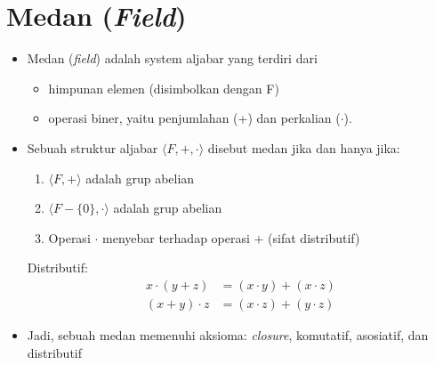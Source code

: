 \documentclass{article}
\begin{document}

\section*{Medan (\textit{Field})}

\begin{itemize}
    \item Medan (\textit{field}) adalah system aljabar yang terdiri dari
    \begin{itemize}
        \item himpunan elemen (disimbolkan dengan F)
        \item operasi biner, yaitu penjumlahan (+) dan perkalian ($\cdot$).
    \end{itemize}

    \item Sebuah struktur aljabar $\langle F, +, \cdot \rangle$ disebut medan jika dan hanya jika:
    \begin{enumerate}
        \item $\langle F, + \rangle$ adalah grup abelian
        \item $\langle F - \{0\}, \cdot \rangle$ adalah grup abelian
        \item Operasi $\cdot$ menyebar terhadap operasi $+$ (sifat distributif)
    \end{enumerate}
    Distributif:
    \[
    \begin{aligned}
    x \cdot (y + z) &= (x \cdot y) + (x \cdot z) \\
    (x + y) \cdot z &= (x \cdot z) + (y \cdot z)
    \end{aligned}
    \]

    \item Jadi, sebuah medan memenuhi aksioma: \textit{closure}, komutatif, asosiatif, dan distributif
\end{itemize}
\end{document}
